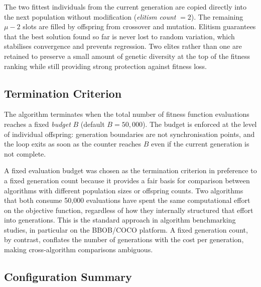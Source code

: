 \documentclass[12pt]{article}
\begin{document}
The two fittest individuals from the current generation are copied directly into
the next population without modification (\emph{elitism count} $= 2$).
The remaining $\mu - 2$ slots are filled by offspring from crossover and mutation.
Elitism guarantees that the best solution found so far is never lost to random
variation, which stabilises convergence and prevents regression.
Two elites rather than one are retained to preserve a small amount of genetic
diversity at the top of the fitness ranking while still providing strong protection
against fitness loss.

\subsection{Termination Criterion}

The algorithm terminates when the total number of fitness function evaluations
reaches a fixed \emph{budget} $B$ (default $B = 50{,}000$).
The budget is enforced at the level of individual offspring: generation boundaries
are not synchronisation points, and the loop exits as soon as the counter reaches
$B$ even if the current generation is not complete.

A fixed evaluation budget was chosen as the termination criterion in preference to
a fixed generation count because it provides a fair basis for comparison between
algorithms with different population sizes or offspring counts.
Two algorithms that both consume 50{,}000 evaluations have spent the same
computational effort on the objective function, regardless of how they internally
structured that effort into generations.
This is the standard approach in algorithm benchmarking studies, in particular on
the BBOB/COCO platform.
A fixed generation count, by contrast, conflates the number of generations with
the cost per generation, making cross-algorithm comparisons ambiguous.

\subsection{Configuration Summary}
\end{document}
